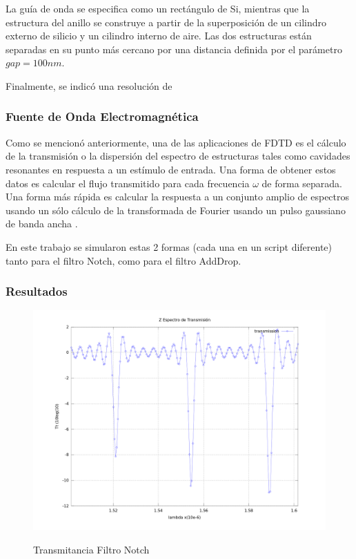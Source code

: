 La guía de onda se especifica como un rectángulo de Si, mientras que la estructura del anillo se construye a partir de la superposición de un cilindro externo de silicio y un cilindro interno de aire. 
Las dos estructuras están separadas en su punto más cercano por una distancia 
definida por el parámetro $gap = 100nm$.

Finalmente, se indicó una resolución de 


\subsubsection{Fuente de Onda Electromagnética} 
Como se mencionó anteriormente, una de las aplicaciones de FDTD es el cálculo 
de la transmisión o la dispersión del espectro de estructuras tales como cavidades 
resonantes en respuesta a un estímulo de entrada. Una forma de obtener estos 
datos es calcular el flujo transmitido para cada frecuencia $\omega$ de forma 
separada. Una forma más rápida es calcular la respuesta a un conjunto 
amplio de espectros usando un sólo cálculo de la transformada de Fourier usando un 
pulso gaussiano de banda ancha \cite{MIT_intro}. 

En este trabajo se simularon estas 2 formas (cada una en un script diferente)
tanto para el filtro Notch, como para el filtro AddDrop.


\subsubsection{Resultados}

\begin{figure}[h!]
\caption{Transmitancia Filtro Notch}
\centering
\includegraphics[width=1.0\textwidth,natwidth=1200,natheight=900]{figs/gausrc_flux_mod-graph_res80.png}
\label{fig:meep_res_n}
\end{figure}

